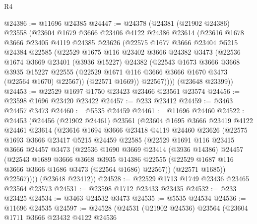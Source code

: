 \begin{lexlean}{R4}
\begin{coremodule}
@24386 := @11696 @24385
@24447 := @24378
    (@24381
      (@21902 @24386)
      @23558
      (@23604
        @1679
        @3666
        @23406
        @4122
        @24386
        @23614
        (@23616
          @1678
          @3666
          @23405
          @4119
          @24385
          @23626
          (@22575
            @1677
            @3666
            @23404
            @5215
            @24384
            @22585
            (@22529
              @1675
              @116
              @23402
              @3666
              @24382
              @3473
              (@22536
                @1674
                @3669
                @23401
                (@3936 @15227)
                @24382
                (@22543
                  @1673
                  @3666
                  @3668
                  @3935
                  @15227
                  @22555
                  (@22529 @1671 @116 @3666 @3666 @1670 @3473 (@22564 @1670) @22567))
                (@22571 @1669))
              @22567))))
      (@23648 @23399))
@24453 := @22529 @1697 @1750 @23423 @23466 @23561 @23574
@24456 := @23598 @1696 @23420 @23422
@24457 := @233 @23412
@24459 := @3463 @24457 @3473
@24460 := @5535 @24459
@24461 := @11696 @24460
@24522 := @24453
    (@24456
      (@21902 @24461)
      @23561
      (@23604
        @1695
        @3666
        @23419
        @4122
        @24461
        @23614
        (@23616
          @1694
          @3666
          @23418
          @4119
          @24460
          @23626
          (@22575
            @1693
            @3666
            @23417
            @5215
            @24459
            @22585
            (@22529
              @1691
              @116
              @23415
              @3666
              @24457
              @3473
              (@22536
                @1690
                @3669
                @23414
                (@3936 @14386)
                @24457
                (@22543
                  @1689
                  @3666
                  @3668
                  @3935
                  @14386
                  @22555
                  (@22529 @1687 @116 @3666 @3666 @1686 @3473 (@22564 @1686) @22567))
                (@22571 @1685))
              @22567))))
      (@23648 @23412))
@24528 := @22529 @1713 @1749 @23436 @23465 @23564 @23573
@24531 := @23598 @1712 @23433 @23435
@24532 := @233 @23425
@24534 := @3463 @24532 @3473
@24535 := @5535 @24534
@24536 := @11696 @24535
@24597 := @24528
    (@24531
      (@21902 @24536)
      @23564
      (@23604
        @1711
        @3666
        @23432
        @4122
        @24536

\end{coremodule}
\end{lexlean}
